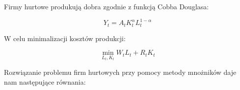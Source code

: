 









Firmy hurtowe produkują dobra zgodnie z funkcją Cobba Douglasa:

\begin{equation}
    Y_t = A_t K_t^\alpha L_t^{1-\alpha}
\end{equation}

W celu minimalizacji kosztów produkcji:

\begin{equation}
    \min_{L_t, K_t} W_t L_t + R_t K_t
\end{equation}


Rozwiązanie problemu firm hurtowych przy pomocy metody mnożników daje nam następujące równania:

